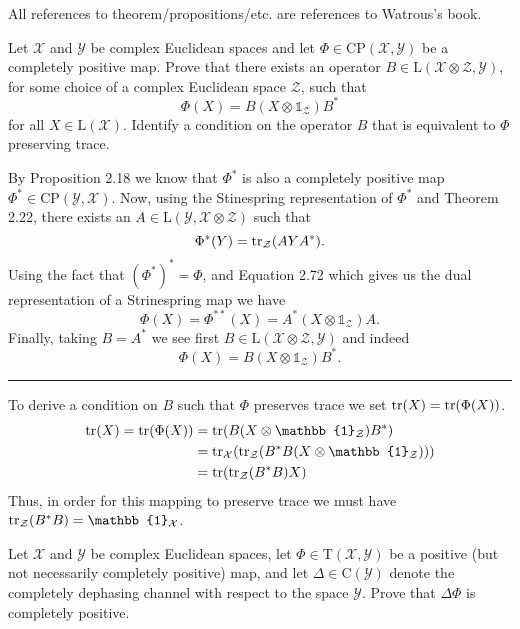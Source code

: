\documentclass[boxes,pages,color=SeaGreen]{homework}
\newcommand{\I}{\mathbb{1}}
\newcommand{\X}{\mathcal{X}}
\newcommand{\Y}{\mathcal{Y}}
\newcommand{\Z}{\mathcal{Z}}
\newcommand{\Lin}{\mathrm{L}}
\newcommand{\Trans}{\mathrm{T}}
\newcommand{\Channel}{\mathrm{C}}
\newcommand{\CP}{\mathrm{CP}}
\begin{document}
All references to theorem/propositions/etc. are references to Watrous's book.

\begin{problem}
Let $\X$ and $\Y$ be complex Euclidean spaces and let
$\Phi\in\CP(\X,\Y)$ be a completely positive map.
Prove that there exists an operator $B\in\Lin(\X\otimes\Z,\Y)$, for some
choice of a complex Euclidean space $\Z$, such that
\[
    \Phi(X) = B (X \otimes \I_{\Z}) B^{\ast}
\]
for all $X\in\Lin(\X)$.
Identify a condition on the operator $B$ that is equivalent to $\Phi$
preserving trace.
\end{problem}

\begin{solution}
    By Proposition 2.18 we know that $\Phi^*$ is also a completely positive map $\Phi^*\in\CP(\Y, \X)$.
    Now, using the Stinespring representation of $\Phi^*$ and Theorem 2.22, there exists an $A\in \Lin(\Y, \X\otimes\Z)$ such that
    \begin{equation*}
        \Phi^*(Y) = \tr_\Z(AYA^*).
    \end{equation*}
    Using the fact that $(\Phi^*)^* = \Phi$, and Equation 2.72 which gives us the dual representation of a Strinespring map we have
    \begin{equation*}
        \Phi(X) = \Phi^{**}(X) = A^*(X\otimes\I_\Z)A.
    \end{equation*}
    Finally, taking $B = A^*$ we see first $B\in\Lin(\X\otimes\Z, \Y)$ and indeed
    \begin{equation*}
        \Phi(X) = B (X \otimes \I_{\Z}) B^*.
    \end{equation*}
    {\color{SeaGreen}\rule{\textwidth}{.5pt}}

    \noindent
    To derive a condition on $B$ such that $\Phi$ preserves trace we set $\tr(X) = \tr(\Phi(X))$.
    \begin{align*}
        \tr(X) = \tr(\Phi(X)) & = \tr(B(X\otimes\I_\Z)B^*)            \\
                              & = \tr_\X(\tr_\Z(B^*B(X\otimes\I_\Z))) \\
                              & = \tr(\tr_\Z(B^*B)X)
    \end{align*}
    Thus, in order for this mapping to preserve trace we must have $\tr_\Z(B^*B) = \I_\X$.
\end{solution}


\begin{problem}
Let $\X$ and $\Y$ be complex Euclidean spaces, let $\Phi\in\Trans(\X,\Y)$
be a positive (but not necessarily completely positive) map, and let
$\Delta\in\Channel(\Y)$ denote the completely dephasing channel with
respect to the space $\Y$.
Prove that $\Delta\Phi$ is completely positive.
\end{problem}
\end{document}
